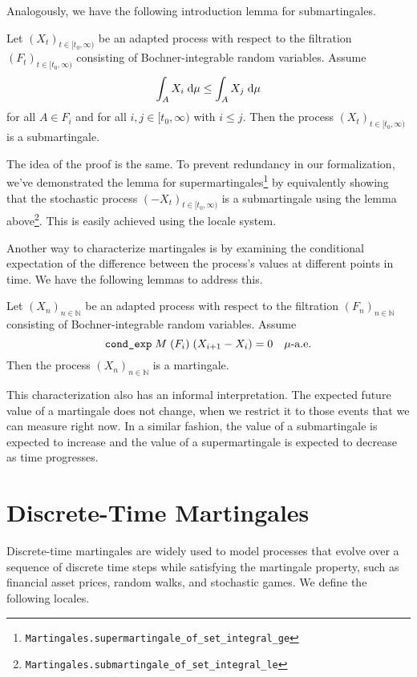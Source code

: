 Analogously, we have the following introduction lemma for submartingales.

\begin{lemma}
	Let $(X_t)_{t \in [t_0,\infty)}$ be an adapted process with respect to the filtration $(F_t)_{t \in [t_0,\infty)}$ consisting of Bochner-integrable random variables.
  Assume 
  \[
  \normalfont \int_A X_i \;\textrm{d}\mu \le \int_A X_j \;\textrm{d}\mu
  \] 
  for all $A \in F_i$ and for all $i,j \in [t_0,\infty)$ with $i \le j$. Then the process $(X_t)_{t \in [t_0,\infty)}$ is a submartingale.
\end{lemma}

The idea of the proof is the same. To prevent redundancy in our formalization, we've demonstrated the lemma for supermartingales\footnote{\texttt{Martingales.supermartingale\_of\_set\_integral\_ge}} by equivalently showing that the stochastic process $(-X_t)_{t \in [t_0,\infty)}$ is a submartingale using the lemma above\footnote{\texttt{Martingales.submartingale\_of\_set\_integral\_le}}. This is easily achieved using the locale system.

Another way to characterize martingales is by examining the conditional expectation of the difference between the process's values at different points in time. We have the following lemmas to address this.

\begin{lemma}
  Let $(X_n)_{n \in \mathbb{N}}$ be an adapted process with respect to the filtration $(F_n)_{n \in \mathbb{N}}$ consisting of Bochner-integrable random variables. Assume 
  \[
  \normalfont \texttt{cond\_exp} \; M \; (F_i) \; (X_{i+1} - X_i) = 0 \quad\mu\textrm{-a.e.}
  \] 
  Then the process $(X_n)_{n \in \mathbb{N}}$ is a martingale.
\end{lemma}

This characterization also has an informal interpretation. The expected future value of a martingale does not change, when we restrict it to those events that we can measure right now. In a similar fashion, the value of a submartingale is expected to increase and the value of a supermartingale is expected to decrease as time progresses.

\section{Discrete-Time Martingales}

Discrete-time martingales are widely used to model processes that evolve over a sequence of discrete time steps while satisfying the martingale property, such as financial asset prices, random walks, and stochastic games. We define the following locales.


